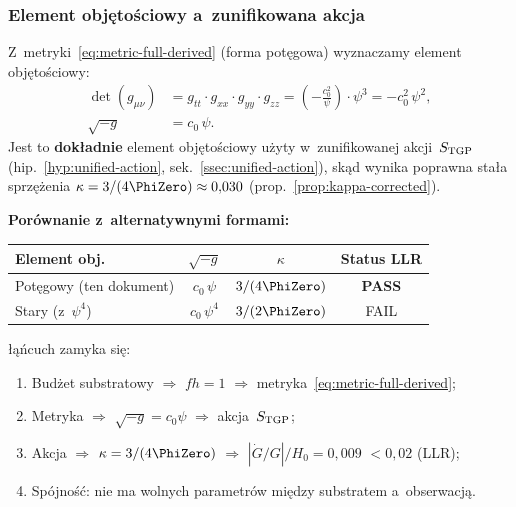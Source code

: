 \subsubsection{Element obj\k{e}to\'sciowy a~zunifikowana akcja}%
\label{sssec:volume-element-check}

Z~metryki~\eqref{eq:metric-full-derived} (forma pot\k{e}gowa)
wyznaczamy element obj\k{e}to\'sciowy:
\begin{align}
  \det(g_{\mu\nu})
  &= g_{tt}\cdot g_{xx}\cdot g_{yy}\cdot g_{zz}
  = \left(-\frac{c_0^2}{\psi}\right)\cdot \psi^3
  = -c_0^2\,\psi^2, \nonumber\\[4pt]
  \sqrt{-g}
  &= c_0\,\psi.
  \label{eq:vol-element-derived}
\end{align}
Jest to \textbf{dok\l{}adnie} element obj\k{e}to\'sciowy u\.zyty
w~zunifikowanej akcji~$S_{\rm TGP}$
(hip.~\ref{hyp:unified-action}, sek.~\ref{ssec:unified-action}),
sk\k{a}d wynika poprawna sta\l{}a sprz\k{e}\.zenia
$\kappa = 3/(4\PhiZero) \approx 0{,}030$
(prop.~\ref{prop:kappa-corrected}).

\medskip
\noindent\textbf{Por\'ownanie z~alternatywnymi formami:}
\begin{center}
\renewcommand{\arraystretch}{1.3}
\begin{tabular}{l|c|c|c}
\toprule
Element obj. & $\sqrt{-g}$ & $\kappa$ & Status LLR \\
\midrule
Pot\k{e}gowy (ten dokument) & $c_0\,\psi$ & $3/(4\PhiZero)$ & \textbf{PASS} \\
Stary (z~$\psi^4$) & $c_0\,\psi^4$ & $3/(2\PhiZero)$ & FAIL \\
\bottomrule
\end{tabular}
\end{center}

\begin{remark}%
\label{rem:metric-action-consistency}
\l{}\k{a}\'ncuch zamyka si\k{e}:
\begin{enumerate}[nosep]
  \item Bud\.zet substratowy $\Rightarrow$ $fh = 1$
        $\Rightarrow$ metryka~\eqref{eq:metric-full-derived};
  \item Metryka $\Rightarrow$ $\sqrt{-g} = c_0\psi$
        $\Rightarrow$ akcja~$S_{\rm TGP}$;
  \item Akcja $\Rightarrow$ $\kappa = 3/(4\PhiZero)$
        $\Rightarrow$ $|\dot G/G|/H_0 = 0{,}009$
        $< 0{,}02$ (LLR);
  \item Sp\'ojno\'s\'c: nie ma wolnych parametr\'ow mi\k{e}dzy
        substratem a~obserwacj\k{a}.
\end{enumerate}
\end{remark}

